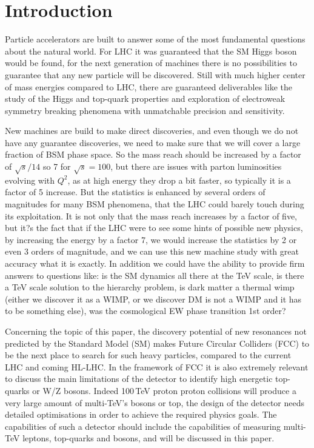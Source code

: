 \section{Introduction}

Particle accelerators are built to answer some of the most fundamental questions about the natural world. For LHC it was guaranteed that the SM Higgs boson would be found, for the next generation of machines there is no possibilities to guarantee that any new particle will be discovered. Still with much higher center of mass energies compared to LHC, there are guaranteed deliverables like the study of the Higgs and top-quark properties and exploration of electroweak symmetry breaking phenomena with unmatchable precision and sensitivity. 

New machines are build to make direct discoveries, and even though we do not have any guarantee discoveries, we need to make sure that we will cover a large fraction of BSM phase space. So the mass reach should be increased by a factor of $\sqrt{s}/14$ so 7 for $\sqrt{s}=100$, but there are issues with parton luminosities evolving with $Q^2$, as at high energy they drop a bit faster, so typically it is a factor of 5 increase. But the statistics is enhanced by several orders of magnitudes for many BSM phenomena, that the LHC could barely touch during its exploitation. It is not only that the mass reach increases by a factor of five, but it?s the fact that if the LHC were to see some hints of possible new physics, by increasing the energy by a factor 7, we would increase the statistics by 2 or even 3 orders of magnitude, and we can use this new machine study with great accuracy what it is exactly. 
In addition we could have the ability to provide firm answers to questions like: is the SM dynamics all there at the TeV scale, is there a TeV scale solution to the hierarchy problem, is dark matter a thermal wimp (either we discover it as a WIMP, or we discover DM is not a WIMP and it has to be something else), was the cosmological EW phase transition 1st order?

Concerning the topic of this paper, the discovery potential of new resonances not predicted by the Standard Model (SM) makes Future Circular Colliders (FCC) to be the next  place to search for such heavy particles, compared to the current LHC and coming HL-LHC.
In the framework of FCC it is also extremely relevant to discuss the main limitations of the detector to identify high energetic top-quarks or W/Z bosons. Indeed 100\,TeV proton proton collisions will produce a very large amount of multi-TeV's bosons or top, the design of the detector needs detailed optimisations in order to achieve the required physics goals. The capabilities of such a detector should include the capabilities of measuring multi-TeV leptons, top-quarks and bosons, and will be discussed in this paper.

